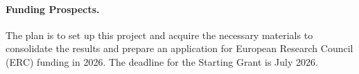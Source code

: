 \documentclass[11pt, a4paper]{article}
\begin{document}




\paragraph{Funding Prospects.}The plan is to set up this project and acquire 
the necessary materials to consolidate the results and prepare an application for 
European Research Council (ERC) funding in 2026. The deadline for the Starting Grant is July 2026.

\end{document}
